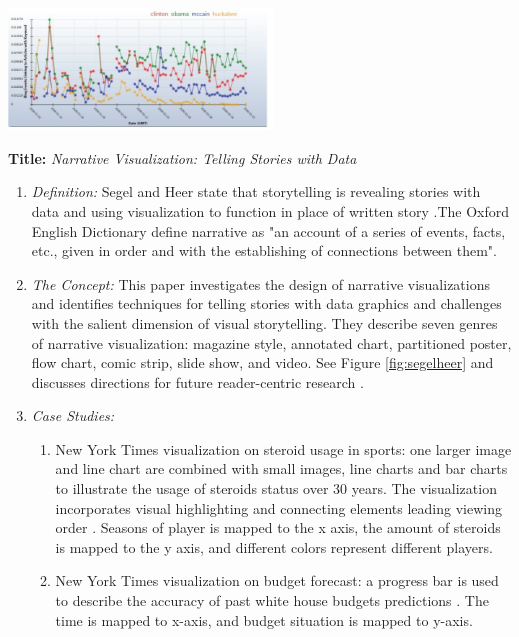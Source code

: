 \documentclass{egpubl}
\begin{document}
\begingroup
\centering
\includegraphics[width=7cm]{./images/fisher}
\label{fisher}
\endgroup

\textbf{Title:} \textit{Narrative Visualization: Telling Stories with Data}
\begin{enumerate}
\item \textit{Definition:} Segel and Heer state that storytelling  is revealing stories with data and using visualization to function in place of written story \cite{segal}.The Oxford English Dictionary define narrative as "an account of a series of events, facts, etc., given in order and with the establishing of connections between them". 
\item \textit{The Concept:} This paper investigates the design of narrative visualizations and identifies techniques for telling stories with data graphics and challenges with the salient dimension of visual storytelling. They describe seven genres of narrative visualization: magazine style, annotated chart, partitioned poster, flow chart, comic strip, slide show, and video. See Figure \ref{fig:segelheer} and discusses directions for future reader-centric research \cite{Heer1}.
\item  \textit{Case Studies:} 
\begin{enumerate}
\item New York Times visualization on steroid usage in sports: one larger image and line chart are combined with small images, line charts and bar charts to illustrate the usage of steroids status over 30 years. The visualization incorporates visual highlighting and connecting elements leading viewing order \cite{steroids}. Seasons of player is mapped to the x axis, the amount of steroids is mapped to the y axis, and different colors represent different players.
\item New York Times visualization on budget forecast: a progress bar is used to describe the accuracy of past white house budgets predictions \cite{budget}. The time is mapped to x-axis, and budget situation is mapped to y-axis.

\end{enumerate}
\end{enumerate}
\end{document}
